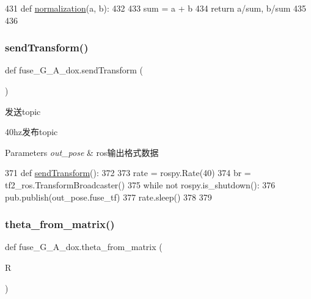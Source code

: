 \begin{DoxyCode}
431 \textcolor{keyword}{def }\hyperlink{namespacefuse___g___a__dox_ab338e80a4f259a8d14b03d63b4c19d3b}{normalization}(a, b):
432 
433     sum = a + b
434     \textcolor{keywordflow}{return} a/sum, b/sum
435 
436 
\end{DoxyCode}
\mbox{\label{namespacefuse___g___a__dox_ad108902a215abb21ef4598a8465d1513}} 
\subsubsection{\texorpdfstring{send\+Transform()}{sendTransform()}}
{\footnotesize\ttfamily def fuse\+\_\+\+G\+\_\+\+A\+\_\+dox.\+send\+Transform (\begin{DoxyParamCaption}{ }\end{DoxyParamCaption})}



发送topic 

40hz发布topic


\begin{DoxyParams}{Parameters}
{\em out\+\_\+pose} & ros输出格式数据 \\
\hline
\end{DoxyParams}

\begin{DoxyCode}
371 \textcolor{keyword}{def }\hyperlink{namespacefuse___g___a__dox_ad108902a215abb21ef4598a8465d1513}{sendTransform}():
372 
373     rate = rospy.Rate(40)
374     br = tf2\_ros.TransformBroadcaster()
375     \textcolor{keywordflow}{while} \textcolor{keywordflow}{not} rospy.is\_shutdown():
376         pub.publish(out\_pose.fuse\_tf)
377         rate.sleep()
378 
379 
\end{DoxyCode}
\mbox{\label{namespacefuse___g___a__dox_a3fb8553ee2aa4421c0b7e1931a0e06d3}} 
\subsubsection{\texorpdfstring{theta\+\_\+from\+\_\+matrix()}{theta\_from\_matrix()}}
{\footnotesize\ttfamily def fuse\+\_\+\+G\+\_\+\+A\+\_\+dox.\+theta\+\_\+from\+\_\+matrix (\begin{DoxyParamCaption}\item[{}]{R }\end{DoxyParamCaption})}



